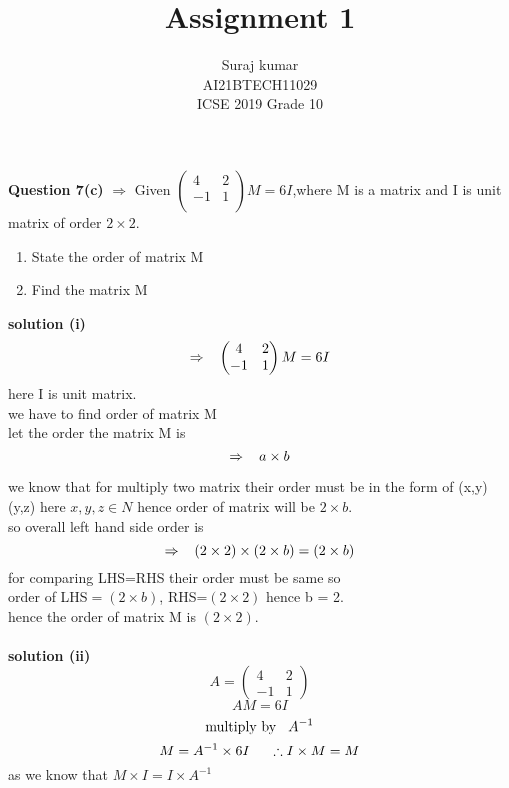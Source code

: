 \documentclass[journal,12pt,twocolumn]{IEEEtran}
\title{Assignment 1}
\author{Suraj kumar \\ \normalsize AI21BTECH11029\\\vspace*{20pt} \Large ICSE 2019 Grade 10}
\newcommand{\myvec}[1]{\ensuremath{\begin{pmatrix}#1\end{pmatrix}}}
\begin{document}
\maketitle
\textbf{Question 7(c)} $\Rightarrow$ Given $\myvec{
     4 & 2 \\
     -1 & 1 \\
      }M=6I $,where M is a matrix and I is unit matrix of order $2\times 2.$
		\begin{enumerate}[label=(\roman*)]
		\item State the order of matrix M
		\item Find the matrix M
	\end{enumerate}	
 \textbf{solution (i) } 
 \begin{equation}
  \Rightarrow  \hspace{3mm} \myvec{
     4 & 2 \\
     -1 & 1 
      }M=6I
      \end{equation}
    here I is unit matrix.\\
    we have to find order of matrix M\\
    let the order the matrix M is  $$ \Rightarrow \hspace{3mm} a\times b$$
      
      we know that for multiply two matrix their order must be in the form of  (x,y) (y,z)  here $x,y,z \in N$
      hence order of matrix will be $2\times b$.\\
      so overall left hand side order is  $$\Rightarrow \hspace{3mm} (2\times 2)\times(2\times b) =(2\times b)$$
      for comparing LHS=RHS their order must be same so \\
      order of LHS$=(2\times b)$,
      RHS=$(2\times 2)$  hence b = 2.\\
      hence the order of matrix M is $(2\times 2).$\\\\

\textbf{solution (ii)}\\
\begin{equation}
    A=\myvec{
      4 & 2\\
      -1 & 1
     }
     \end{equation}
     \begin{equation}
       AM=6I
     \end{equation}
    \begin{equation}
    \text{multiply by}\hspace{3mm} A^{-1}
    \end{equation}
    \begin{equation}
    M=A^{-1}\times 6I \hspace{5mm} \therefore I\times M=M
    \end{equation}
    as we know that  $M \times I=I\times A^{-1}$
    
\end{document}
